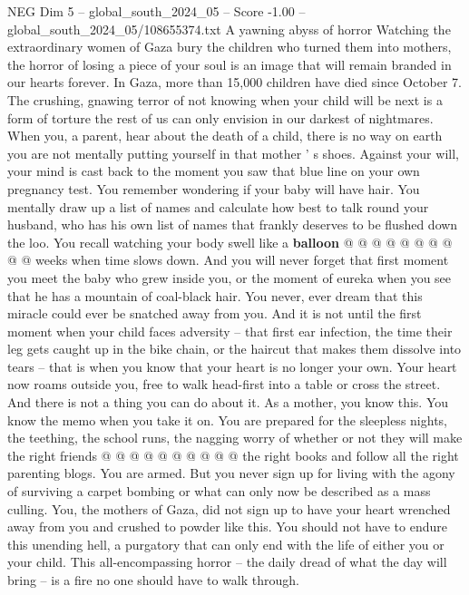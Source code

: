 \begin{textsample}{NEG Dim 5 – global\_south\_2024\_05 – Score -1.00 – global\_south\_2024\_05/108655374.txt}  \label{ex:f5_neg_380}
A yawning abyss of horror Watching the extraordinary women of Gaza bury the children who turned them into mothers, the horror of losing a piece of your soul is an image that will remain branded in our hearts forever.
In Gaza, more than 15,000 children have died since October 7.
The crushing, gnawing terror of not knowing when your child will be next is a form of torture the rest of us can only envision in our darkest of nightmares.
When you, a parent, hear about the death of a child, there is no way on earth you are not mentally putting yourself in that mother ' s shoes.
Against your will, your mind is cast back to the moment you saw that blue line on your own pregnancy test.
You remember wondering if your baby will have hair.
You mentally draw up a list of names and calculate how best to talk round your husband, who has his own list of names that frankly deserves to be flushed down the loo.
You recall watching your body swell like a \textbf{balloon} @ @ @ @ @ @ @ @ @ @ weeks when time slows down.
And you will never forget that first moment you meet the baby who grew inside you, or the moment of eureka when you see that he has a mountain of coal-black hair.
You never, ever dream that this miracle could ever be snatched away from you.
And it is not until the first moment when your child faces adversity -- that first ear infection, the time their leg gets caught up in the bike chain, or the haircut that makes them dissolve into tears -- that is when you know that your heart is no longer your own.
Your heart now roams outside you, free to walk head-first into a table or cross the street.
And there is not a thing you can do about it.
As a mother, you know this.
You know the memo when you take it on.
You are prepared for the sleepless nights, the teething, the school runs, the nagging worry of whether or not they will make the right friends @ @ @ @ @ @ @ @ @ @ the right books and follow all the right parenting blogs.
You are armed.
But you never sign up for living with the agony of surviving a carpet bombing or what can only now be described as a mass culling.
You, the mothers of Gaza, did not sign up to have your heart wrenched away from you and crushed to powder like this.
You should not have to endure this unending hell, a purgatory that can only end with the life of either you or your child.
This all-encompassing horror -- the daily dread of what the day will bring -- is a fire no one should have to walk through.

\end{textsample}
